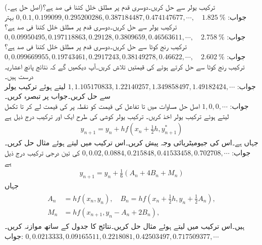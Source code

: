 \quad
ترکیب یولر سے  حل کریں۔دوسری قدم پر مطلق خلل کتنا فی صد ہے؟(اصل حل  ہے۔)\\
جواب:\quad
$0,0.1,0.199099,0.295200286,0.387184487,0.474147677,\cdots, \quad \SI{1.825}{\percent}$
\quad
بہتر ترکیب یولر سے  حل کریں۔دوسری قدم پر مطلق خلل کتنا فی صد ہے؟\\
جواب:\quad
$0,0.09950495,0.197118863,0.29128,0.3809659,0.46563611,\cdots,\quad \SI{2.758}{\percent}$
\quad
ترکیب رنج کوٹا  سے  حل کریں۔دوسری قدم پر مطلق خلل کتنا فی صد ہے؟\\
جواب:\quad
$0,0.099669955,0.19743461,0.2917243,0.38149278,0.46622,\cdots,\quad \SI{2.602}{\percent}$
\quad
ترکیب رنج کوٹا  سے  حل کرتے ہوئے  کی قیمتیں تلاش کریں۔آپ دیکھیں گے کہ نتائج پانچ اعشاریہ درست ہیں۔\\
جواب:\quad
$1,1.105170833,1.22140257,1.349858497,1.49182424,\cdots$
\quad
{} لیتے ہوئے ترکیب یولر سے  حل کریں۔جواب پر تبصرہ کریں۔\\
جواب:\quad
$1,0,0,\cdots$
اصل حل 
\quad
مساوات  میں  تا  تفاعل  کی قیمت کو نقطہ  پر  کی قیمت لے کر  تا  تکمل لیتے ہوئے ترکیب یولر اخذ کریں۔
\quad
ترکیب یولر کوشی کی طرح ایک اور ترکیب درج ذیل ہے
\begin{align*}
y_{n+1}=y_n+hf(x_n+\tfrac{1}{2}h,y^*_{n+1})
\end{align*}
جہاں  ہے۔اس کی جیومیٹریائی وجہ پیش کریں۔اس ترکیب میں  لیتے ہوئے مثال  حل کریں۔\\
جواب:\quad
$0,0.02,0.0884,0.215848,0.41533458,0.702708,\cdots$
\quad
{} کی تین درجی ترکیب درج ذیل ہے
\begin{align*}
y_{n+1}=y_n+\tfrac{1}{6}(A_n+4B_n+M_n)
\end{align*}
جہاں
\begin{gather}
\begin{aligned}
A_n&=hf(x_n,y_n),\quad B_n=hf(x_n+\tfrac{1}{2}h,y_n+\tfrac{1}{2}A_n),\\
M_n&=hf(x_{n+1},y_n-A_n+2B_n),
\end{aligned}
\end{gather}
ہیں۔اس ترکیب میں  لیتے ہوئے مثال  حل کریں۔نتائج کا جدول  کے ساتھ موازنہ کریں۔\\
جواب:\quad
$0,0.0213333,0.09165511,0.2218081,0.42503497,0.717509377,\cdots$

